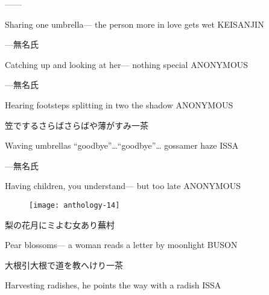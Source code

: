 \begin{haiku}
   ---\hfill{---}

    \vin{} Sharing one umbrella---
    \vin{} \vin{} the person more in love
    \vin{} \vin{} \vin{} gets wet \hspace{\fill} KEISANJIN
\end{haiku}

\begin{haiku}
    {---}\hfill{\FH 無名氏}

    \vin{} Catching up
    \vin{} \vin{} and looking at her---
    \vin{} \vin{} \vin{} nothing special \hspace{\fill} ANONYMOUS
\end{haiku}

\begin{haiku}
    {---}\hfill{\FH 無名氏}

    \vin{} Hearing footsteps
    \vin{} \vin{} splitting in two
    \vin{} \vin{} \vin{} the shadow \hspace{\fill} ANONYMOUS
\end{haiku}

\begin{haiku}
    {\FH 笠でするさらばさらばや薄がすみ}\hfill{\FH 一茶}

    \vin{} Waving umbrellas
    \vin{} \vin{} ``goodbye''\ldots``goodbye''\ldots
    \vin{} \vin{} \vin{} gossamer haze \hspace{\fill} ISSA
\end{haiku}

\begin{haiku}
    {---}\hfill{\FH 無名氏}

    \vin{} Having children,
    \vin{} \vin{} you understand---
    \vin{} \vin{} \vin{} but too late \hspace{\fill} ANONYMOUS
\end{haiku}

\begin{figure}
    \texttt{[image: anthology-14]}
\end{figure}

\begin{haiku}
    {\FH 梨の花月にミよむ女あり}\hfill{\FH 蕪村}

    \vin{} Pear blossoms---
    \vin{} \vin{} a woman reads a letter
    \vin{} \vin{} \vin{} by moonlight \hspace{\fill} BUSON
\end{haiku}

\begin{haiku}
    {\FH 大根引大根で道を教へけり}\hfill{\FH 一茶}

    \vin{} Harvesting radishes,
    \vin{} \vin{} he points the way
    \vin{} \vin{} \vin{} with a radish \hspace{\fill} ISSA
\end{haiku}

